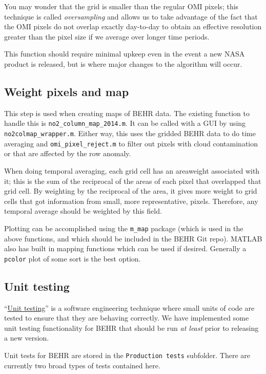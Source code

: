 \documentclass[12pt]{article}
\begin{document}
		You may wonder that the grid is smaller than the regular OMI pixels; this technique is called \emph{oversampling} and allows us to take advantage of the fact that the OMI pixels do not overlap exactly day-to-day to obtain an effective resolution greater than the pixel size if we average over longer time periods.
		
		This function should require minimal upkeep even in the event a new NASA product is released, but is where major changes to the algorithm will occur.
		
	\subsection{Weight pixels and map}
	This step is used when creating maps of BEHR  data. The existing function to handle this is \lstinline$no2_column_map_2014.m$. It can be called with a GUI by using \lstinline$no2colmap_wrapper.m$. Either way, this uses the gridded BEHR data to do time averaging and \lstinline$omi_pixel_reject.m$ to filter out pixels with cloud contamination or that are affected by the row anomaly.
	
	When doing temporal averaging, each grid cell has an areaweight associated with it; this is the sum of the reciprocal of the areas of each pixel that overlapped that grid cell. By weighting by the reciprocal of the area, it gives more weight to grid cells that got information from small, more representative, pixels.  Therefore, any temporal average should be weighted by this field.
	
	Plotting can be accomplished using the \lstinline$m_map$ package (which is used in the above functions, and which should be included in the BEHR Git repo). MATLAB also has built in mapping functions which can be used if desired. Generally a \lstinline$pcolor$ plot of some sort is the best option.
	
	\subsection{Unit testing}\label{sec:unit-testing}
	``\href{https://en.wikipedia.org/wiki/Unit_testing}{Unit testing}'' is a software engineering technique where small units of code are tested to ensure that they are behaving correctly. We have implemented some unit testing functionality for BEHR that should be run \emph{at least} prior to releasing a new version.  
	
	Unit tests for BEHR are stored in the \lstinline$Production tests$ subfolder. There are currently two broad types of tests contained here.
\end{document}

